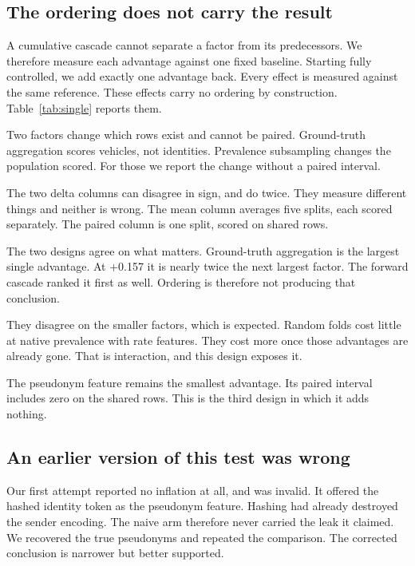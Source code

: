 \documentclass[conference]{IEEEtran}
\begin{document}
\subsection{The ordering does not carry the result}
\label{sec:single}

A cumulative cascade cannot separate a factor from its predecessors.
We therefore measure each advantage against one fixed baseline.
Starting fully controlled, we add exactly one advantage back.
Every effect is measured against the same reference.
These effects carry no ordering by construction.
Table~\ref{tab:single} reports them.


Two factors change which rows exist and cannot be paired.
Ground-truth aggregation scores vehicles, not identities.
Prevalence subsampling changes the population scored.
For those we report the change without a paired interval.

The two delta columns can disagree in sign, and do twice.
They measure different things and neither is wrong.
The mean column averages five splits, each scored separately.
The paired column is one split, scored on shared rows.


The two designs agree on what matters.
Ground-truth aggregation is the largest single advantage.
At +0.157 it is nearly twice the next largest factor.
The forward cascade ranked it first as well.
Ordering is therefore not producing that conclusion.

They disagree on the smaller factors, which is expected.
Random folds cost little at native prevalence with rate features.
They cost more once those advantages are already gone.
That is interaction, and this design exposes it.

The pseudonym feature remains the smallest advantage.
Its paired interval includes zero on the shared rows.
This is the third design in which it adds nothing.

\subsection{An earlier version of this test was wrong}

Our first attempt reported no inflation at all, and was invalid.
It offered the hashed identity token as the pseudonym feature.
Hashing had already destroyed the sender encoding.
The naive arm therefore never carried the leak it claimed.
We recovered the true pseudonyms and repeated the comparison.
The corrected conclusion is narrower but better supported.
\end{document}
